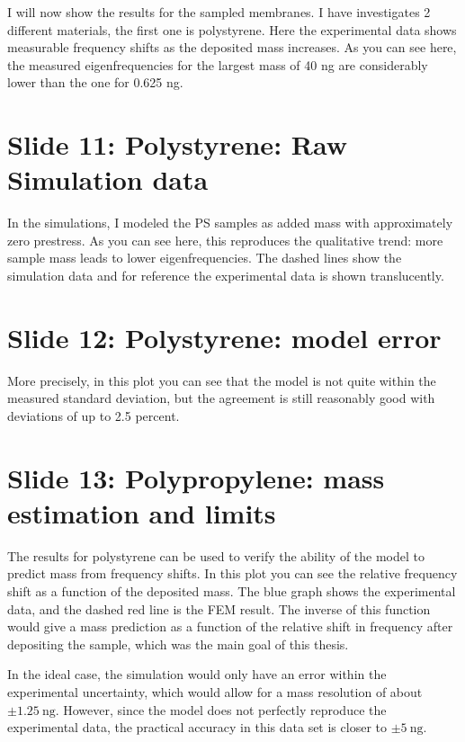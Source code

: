 \documentclass[11pt,a4paper]{article}
\begin{document}
I will now show the results for the sampled membranes. I have investigates 2 different materials, the first one is polystyrene.
Here the experimental data shows measurable frequency shifts as the deposited mass increases. As you can see here, the measured eigenfrequencies for the largest mass of 40 ng are considerably lower than the one for 0.625 ng.

\section*{Slide 11: Polystyrene: Raw Simulation data}

In the simulations, I modeled the PS samples as added mass with approximately zero prestress. As you can see here, this reproduces the qualitative trend: more sample mass leads to lower eigenfrequencies. The dashed lines show the simulation data and for reference the experimental data is shown translucently.

\section*{Slide 12: Polystyrene: model error}

More precisely, in this plot you can see that the model is not quite within the measured standard deviation, but the agreement is still reasonably good with deviations of up to 2.5 percent.

\section*{Slide 13: Polypropylene: mass estimation and limits}

The results for polystyrene can be used to verify the ability of the model to predict mass from frequency shifts.
In this plot you can see the relative frequency shift as a function of the deposited mass. The blue graph shows the experimental data, and the dashed red line is the FEM result. The inverse of this function would give a mass prediction as a function of the relative shift in frequency after depositing the sample, which was the main goal of this thesis.

In the ideal case, the simulation would only have an error within the experimental uncertainty, which would allow for a mass resolution of about \(\pm\SI{1.25}{\nano\gram}\). However, since the model does not perfectly reproduce the experimental data, the practical accuracy in this data set is closer to \(\pm\SI{5}{\nano\gram}\).
\end{document}
